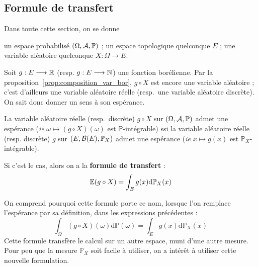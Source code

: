\documentclass[../integ-proba.tex]{subfiles}
\begin{document}
    \subsection{Formule de transfert}

    Dans toute cette section, on se donne
    \begin{itemize}
        \itemb un espace probabilisé $\left(\Omega, \mathcal{A}, \mathbb{P}\right)$ ;
        \itemb un espace topologique quelconque $E$ ;
        \itemb une variable aléatoire quelconque $X:\Omega \longrightarrow E$.
    \end{itemize}

    \begin{thm}
        Soit $g:E \longrightarrow \mathbb{R}$ (resp. $g:E \longrightarrow \mathbb{N}$) une fonction borélienne.
        Par la proposition~\ref{prop:composition_var_bor}, $g \circ X$ est encore une variable aléatoire ;
        c'est d'ailleurs une variable aléatoire réelle (resp.\ une variable aléatoire discrète).
        On sait donc donner un sens à son espérance.

        La variable aléatoire réelle (resp.\ discrète) $g \circ X$ sur $\left(\Omega, \mathcal{A}, \mathbb{P}\right)$ admet une espérance (\textit{ie} $\omega \mapsto (g \circ X)(\omega)$ est $\mathbb{P}$-intégrable) ssi la variable aléatoire réelle (resp. discrète) $g$ sur $\left(E, \mathcal{B}(E), \mathbb{P}_X\right)$ admet une espérance (\textit{ie} $x \mapsto g(x)$ est $\mathbb{P}_X$-intégrable).

        Si c'est le cas, alors on a la \textbf{formule de transfert} :
        \begin{displaymath}
            \mathbb{E}(g \circ X) = \int_E g(x)\textnormal{d}\mathbb{P}_X(x)
        \end{displaymath}
    \end{thm}

    \begin{rem}
        On comprend pourquoi cette formule porte ce nom, lorsque l'on remplace l'espérance par sa définition, dans les expressions précédentes :
        \begin{displaymath}
            \int_\Omega (g \circ X)(\omega) \text{d} \mathbb{P}(\omega) = \int_E g(x) \text{d} \mathbb{P}_X(x)
        \end{displaymath}
        Cette formule transfère le calcul sur un autre espace, muni d'une autre mesure.
        Pour peu que la mesure $\mathbb{P}_X$ soit facile à utiliser, on a intérêt à utiliser cette nouvelle formulation.
    \end{rem}
\end{document}
